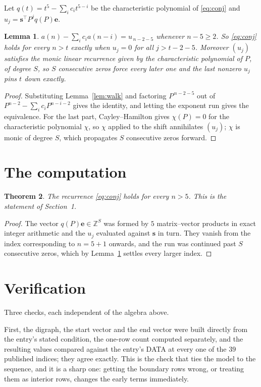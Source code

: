 \documentclass[11pt,a4paper]{article}
\theoremstyle{plain}
\newtheorem{theorem}{Theorem}
\newtheorem{lemma}[theorem]{Lemma}
\theoremstyle{definition}
\begin{document}
Let $q(t)=t^{5}-\sum_i c_i t^{5-i}$ be the characteristic polynomial of
\eqref{eq:conj} and $u_j=\mathbf{s}^{\!\top}P^{j}q(P)\mathbf{e}$.

\begin{lemma}\label{lem:crit}
$a(n)-\sum_i c_i a(n-i)=u_{\,n-2-5}$ whenever $n-5\ge2$. So \eqref{eq:conj}
holds for every $n>t$ exactly when $u_j=0$ for all $j>t-2-5$. Moreover $(u_j)$
satisfies the monic linear recurrence given by the characteristic polynomial of $P$, of
degree $S$, so $S$ consecutive zeros force every later one and the last nonzero $u_j$ pins
$t$ down exactly.
\end{lemma}

\begin{proof}
Substituting Lemma~\ref{lem:walk} and factoring $P^{\,n-2-5}$ out of
$P^{n-2}-\sum_i c_i P^{n-i-2}$ gives the identity, and letting the exponent run gives the
equivalence. For the last part, Cayley--Hamilton gives $\chi(P)=0$ for the characteristic
polynomial $\chi$, so $\chi$ applied to the shift annihilates $(u_j)$; $\chi$ is monic of
degree $S$, which propagates $S$ consecutive zeros forward.
\end{proof}

\section{The computation}

\begin{theorem}
The recurrence \eqref{eq:conj} holds for every $n>5$. This is the statement of
Section~1.
\end{theorem}

\begin{proof}
The vector $q(P)\mathbf{e}\in\mathbb{Z}^{S}$ was formed by $5$ matrix--vector
products in exact integer arithmetic and the $u_j$ evaluated against $\mathbf{s}$ in turn.
They vanish from the index corresponding to $n=5+1$ onwards, and the run was continued
past $S$ consecutive zeros, which by Lemma~\ref{lem:crit} settles every larger index.
\end{proof}

\section{Verification}

Three checks, each independent of the algebra above.

First, the digraph, the start vector and the end vector were built directly from the
entry's stated condition, the one-row count computed separately, and the resulting values
compared against the entry's DATA at every one of the $39$ published indices; they
agree exactly. This is the check that ties the model to the sequence, and it is a sharp one:
getting the boundary rows wrong, or treating them as interior rows, changes the early terms
immediately.
\end{document}
